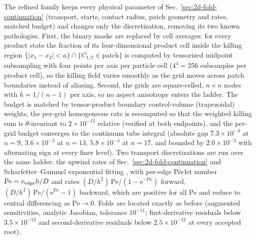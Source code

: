 \documentclass[aps,pre,reprint,amsmath,amssymb,longbibliography,floatfix]{revtex4-2}
\newcommand{\e}{\mathrm e}
\begin{document}
The refined family keeps every physical parameter of
Sec.~\ref{sec:2d-fold-continuation} (transport, starts, contact radius,
patch geometry and rates, matched budget) and changes only the
discretization, removing its two known pathologies. First, the binary
masks are replaced by cell averages: for every product state the fraction
of its four-dimensional product cell inside the killing region
\(\{|x_1-x_2|<a\}\cap\{C_{1/2}\in\text{patch}\}\) is computed by tensorized
midpoint subsampling with four points per axis per particle cell
(\(4^4=256\) subsamples per product cell), so the killing field varies
smoothly as the grid moves across patch boundaries instead of aliasing.
Second, the grids are square-celled, \(n\times n\) nodes with
\(h=1/(n-1)\) per axis, so no aspect anisotropy enters the ladder. The
budget is matched by tensor-product boundary control-volume (trapezoidal)
weights, the per-grid homogeneous rate is recomputed so that the weighted
killing sum is \(\theta\)-invariant to \(2\times10^{-12}\) relative
(verified at both endpoints), and the per-grid budget converges to the
continuum tube integral (absolute gap \(7.3\times10^{-3}\) at \(n=9\),
\(3.6\times10^{-3}\) at \(n=13\), \(5.8\times10^{-4}\) at \(n=17\),
and bounded by \(2.0\times10^{-3}\) with alternating sign at every finer
level). Two transport
discretizations are run over the same ladder: the upwind rates of
Sec.~\ref{sec:2d-fold-continuation} and Scharfetter--Gummel exponential
fitting \cite{scharfetterGummel1969}, with per-edge P\'eclet number
\(\mathrm{Pe}=v_{\rm edge}h/D\) and
rates \((D/h^2)\,\mathrm{Pe}/(1-\e^{-\mathrm{Pe}})\) forward,
\((D/h^2)\,\mathrm{Pe}/(\e^{\mathrm{Pe}}-1)\) backward, which are positive
for all \(\mathrm{Pe}\) and reduce to central differencing as
\(\mathrm{Pe}\to0\). Folds are located exactly as before (augmented
sensitivities, analytic Jacobian, tolerance \(10^{-11}\); first-derivative
residuals below \(3.5\times10^{-13}\) and second-derivative residuals below
\(2.5\times10^{-12}\) at every accepted root).
\end{document}
